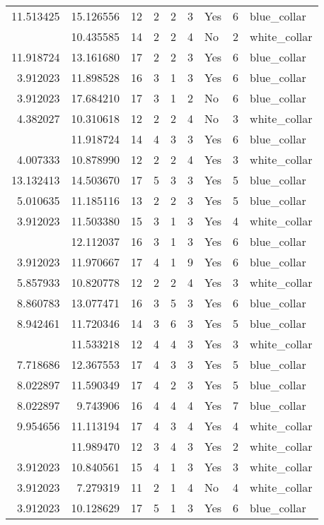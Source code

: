 \documentclass[
]{article}
\begin{document}
\begin{longtable}[t]{rrrrrllrl}
11.513425 & 15.126556 & 12 & 2 & 2 & 3 & Yes & 6 & blue\_collar\\
\addlinespace
5.247024 & 10.435585 & 14 & 2 & 2 & 4 & No & 2 & white\_collar\\
11.918724 & 13.161680 & 17 & 2 & 2 & 3 & Yes & 6 & blue\_collar\\
3.912023 & 11.898528 & 16 & 3 & 1 & 3 & Yes & 6 & blue\_collar\\
3.912023 & 17.684210 & 17 & 3 & 1 & 2 & No & 6 & blue\_collar\\
4.382027 & 10.310618 & 12 & 2 & 2 & 4 & No & 3 & white\_collar\\
\addlinespace
8.527143 & 11.918724 & 14 & 4 & 3 & 3 & Yes & 6 & blue\_collar\\
4.007333 & 10.878990 & 12 & 2 & 2 & 4 & Yes & 3 & white\_collar\\
13.132413 & 14.503670 & 17 & 5 & 3 & 3 & Yes & 5 & blue\_collar\\
5.010635 & 11.185116 & 13 & 2 & 2 & 3 & Yes & 5 & blue\_collar\\
3.912023 & 11.503380 & 15 & 3 & 1 & 3 & Yes & 4 & white\_collar\\
\addlinespace
3.912023 & 12.112037 & 16 & 3 & 1 & 3 & Yes & 6 & blue\_collar\\
3.912023 & 11.970667 & 17 & 4 & 1 & 9 & Yes & 6 & blue\_collar\\
5.857933 & 10.820778 & 12 & 2 & 2 & 4 & Yes & 3 & white\_collar\\
8.860783 & 13.077471 & 16 & 3 & 5 & 3 & Yes & 6 & blue\_collar\\
8.942461 & 11.720346 & 14 & 3 & 6 & 3 & Yes & 5 & blue\_collar\\
\addlinespace
7.625595 & 11.533218 & 12 & 4 & 4 & 3 & Yes & 3 & white\_collar\\
7.718686 & 12.367553 & 17 & 4 & 3 & 3 & Yes & 5 & blue\_collar\\
8.022897 & 11.590349 & 17 & 4 & 2 & 3 & Yes & 5 & blue\_collar\\
8.022897 & 9.743906 & 16 & 4 & 4 & 4 & Yes & 7 & blue\_collar\\
9.954656 & 11.113194 & 17 & 4 & 3 & 4 & Yes & 4 & white\_collar\\
\addlinespace
8.860783 & 11.989470 & 12 & 3 & 4 & 3 & Yes & 2 & white\_collar\\
3.912023 & 10.840561 & 15 & 4 & 1 & 3 & Yes & 3 & white\_collar\\
3.912023 & 7.279319 & 11 & 2 & 1 & 4 & No & 4 & white\_collar\\
3.912023 & 10.128629 & 17 & 5 & 1 & 3 & Yes & 6 & blue\_collar\\

\end{longtable}
\end{document}
